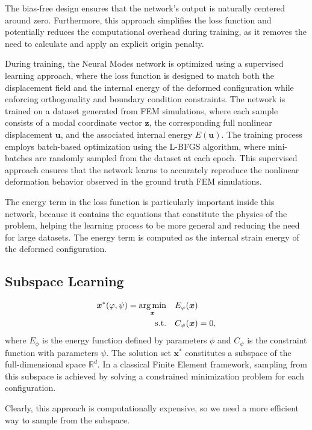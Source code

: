 The bias-free design ensures that the network's output is naturally centered around zero. Furthermore, this approach simplifies the loss function and potentially reduces the computational overhead during training, as it removes the need to calculate and apply an explicit origin penalty. 

During training, the Neural Modes network is optimized using a supervised learning approach, where the loss function is designed to match both the displacement field and the internal energy of the deformed configuration while enforcing orthogonality and boundary condition constraints. The network is trained on a dataset generated from FEM simulations, where each sample consists of a modal coordinate vector \( \bm{z} \), the corresponding full nonlinear displacement \( \bm{u} \), and the associated internal energy \( E(\bm{u}) \). The training process employs batch-based optimization using the L-BFGS algorithm, where mini-batches are randomly sampled from the dataset at each epoch. This supervised approach ensures that the network learns to accurately reproduce the nonlinear deformation behavior observed in the ground truth FEM simulations.

The energy term in the loss function is particularly important inside this network, because it contains the equations that constitute the physics of the problem, helping the learning process to be more general and reducing the need for large datasets. The energy term is computed as the internal strain energy of the deformed configuration.

\subsection{Subspace Learning}
\begin{align}
    \label{eq:constrained_energy_minimization}
    \bm{x}^*(\varphi, \psi) = \underset{\bm{x}}{\operatorname*{arg\,min}} \quad & E_\varphi(\bm{x}) \\
    \text{s.t.} \quad & C_\psi(\bm{x}) = 0, \nonumber
\end{align}
where \( E_\phi \) is the energy function defined by parameters \(\phi\) and \( C_\psi \) is the constraint function with parameters \(\psi\). The solution set \( \bm{x}^*\) constitutes a subspace of the full-dimensional space \( \mathbb{R}^d \). In a classical Finite Element framework, sampling from this subspace is achieved by solving a constrained minimization problem for each configuration. 

Clearly, this approach is computationally expensive, so we need a more efficient way to sample from the subspace.

